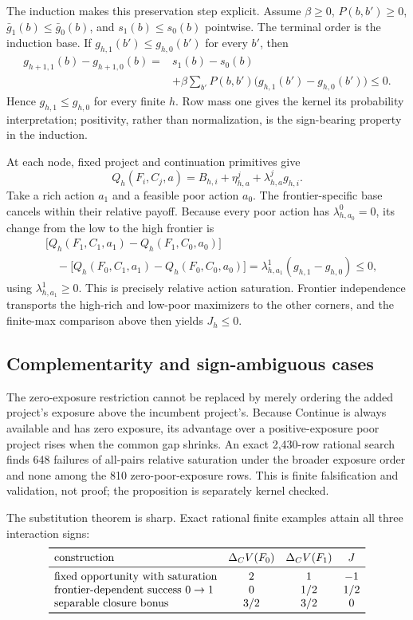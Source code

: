 The induction makes this preservation step explicit.  Assume
\(\beta\ge0\), \(P(b,b')\ge0\), \(\bar g_1(b)\le\bar g_0(b)\), and
\(s_1(b)\le s_0(b)\) pointwise.  The terminal order is the induction base.
If \(g_{h,1}(b')\le g_{h,0}(b')\) for every \(b'\), then
\[
\begin{aligned}
 g_{h+1,1}(b)-g_{h+1,0}(b)
   ={}&s_1(b)-s_0(b)\\
     &+\beta\sum_{b'}P(b,b')
       \bigl(g_{h,1}(b')-g_{h,0}(b')\bigr)
   \le0.
\end{aligned}
\]
Hence \(g_{h,1}\le g_{h,0}\) for every finite \(h\).  Row mass one gives the
kernel its probability interpretation; positivity, rather than normalization,
is the sign-bearing property in the induction.

At each node, fixed project and continuation primitives give
\[
 Q_h(F_i,C_j,a)=B_{h,i}+\eta^j_{h,a}
                  +\lambda^j_{h,a}g_{h,i}.
\]
Take a rich action \(a_1\) and a feasible poor action \(a_0\).  The
frontier-specific base cancels within their relative payoff.  Because every
poor action has \(\lambda^0_{h,a_0}=0\), its change from the low to the high
frontier is
\[
\begin{aligned}
 &\bigl[Q_h(F_1,C_1,a_1)-Q_h(F_1,C_0,a_0)\bigr]\\
 &\quad-
 \bigl[Q_h(F_0,C_1,a_1)-Q_h(F_0,C_0,a_0)\bigr]
 =\lambda^1_{h,a_1}(g_{h,1}-g_{h,0})\le0,
\end{aligned}
\]
using \(\lambda^1_{h,a_1}\ge0\).  This is precisely relative action
saturation.  Frontier independence transports the high-rich and low-poor
maximizers to the other corners, and the finite-max comparison above then
yields \(J_h\le0\).

\subsection{Complementarity and sign-ambiguous cases}

The zero-exposure restriction cannot be replaced by merely ordering the added
project's exposure above the incumbent project's.  Because Continue is always
available and has zero exposure, its advantage over a positive-exposure poor
project rises when the common gap shrinks.  An exact 2,430-row rational search
finds 648 failures of all-pairs relative saturation under the broader exposure
order and none among the 810 zero-poor-exposure rows.  This is finite
falsification and validation, not proof; the proposition is separately kernel
checked.

The substitution theorem is sharp.  Exact rational finite examples attain
all three interaction signs:
\[
\begin{array}{lccc}
\toprule
\text{construction}
  &\Delta_CV(F_0)&\Delta_CV(F_1)&J\\
\midrule
\text{fixed opportunity with saturation}&2&1&-1\\
\text{frontier-dependent success }0\to1&0&1/2&1/2\\
\text{separable closure bonus}&3/2&3/2&0\\
\bottomrule
\end{array}
\]

